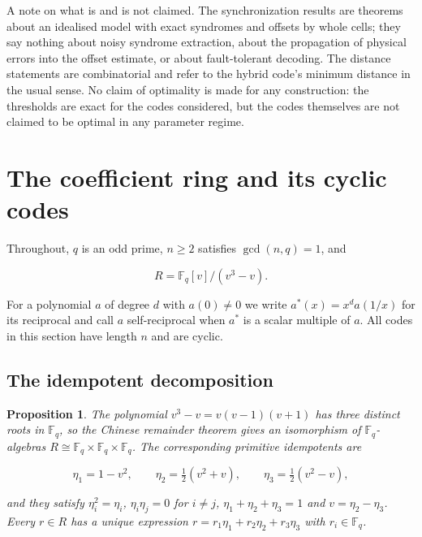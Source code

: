 \documentclass[11pt,reqno]{amsart}
\newtheorem{proposition}[theorem]{Proposition}
\theoremstyle{definition}
\theoremstyle{remark}
\newcommand{\F}{\mathbb{F}}
\begin{document}
A note on what is and is not claimed. The synchronization results are theorems about an idealised model with exact syndromes and offsets by whole cells; they say nothing about noisy syndrome extraction, about the propagation of physical errors into the offset estimate, or about fault-tolerant decoding. The distance statements are combinatorial and refer to the hybrid code's minimum distance in the usual sense. No claim of optimality is made for any construction: the thresholds are exact for the codes considered, but the codes themselves are not claimed to be optimal in any parameter regime.


\section{The coefficient ring and its cyclic codes}\label{sec:the-coefficient-ring-and-its-cyclic-codes}

Throughout, $q$ is an odd prime, $n\ge2$ satisfies $\gcd(n,q)=1$, and


\begin{equation}\label{eq:ring}
R=\F_q[v]/(v^3-v).
\end{equation}

For a polynomial $a$ of degree $d$ with $a(0)\neq0$ we write $a^*(x)=x^{d}a(1/x)$ for its reciprocal and call $a$ self-reciprocal when $a^*$ is a scalar multiple of $a$. All codes in this section have length $n$ and are cyclic.


\subsection{The idempotent decomposition}

\begin{proposition}\label{ring}
The polynomial $v^3-v=v(v-1)(v+1)$ has three distinct roots in $\F_q$, so the Chinese remainder theorem gives an isomorphism of $\F_q$-algebras $R\cong\F_q\times\F_q\times\F_q$. The corresponding primitive idempotents are

\begin{equation}\label{eq:idem}
\eta_1=1-v^2,\qquad \eta_2=\tfrac12(v^2+v),\qquad \eta_3=\tfrac12(v^2-v),
\end{equation}

and they satisfy $\eta_i^2=\eta_i$, $\eta_i\eta_j=0$ for $i\neq j$, $\eta_1+\eta_2+\eta_3=1$ and $v=\eta_2-\eta_3$. Every $r\in R$ has a unique expression $r=r_1\eta_1+r_2\eta_2+r_3\eta_3$ with $r_i\in\F_q$.
\end{proposition}
\end{document}
